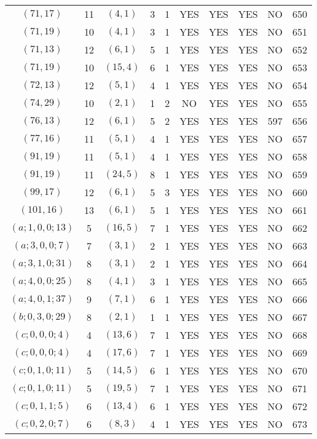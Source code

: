 \begin{longtable}{|c|c|c|c|c|c|c|c|c|c|}
$(71, 17)$ & 11 & $(4, 1)$ & 3 & 1 & YES & YES & YES & NO & 650\\
$(71, 19)$ & 10 & $(4, 1)$ & 3 & 1 & YES & YES & YES & NO & 651\\
$(71, 13)$ & 12 & $(6, 1)$ & 5 & 1 & YES & YES & YES & NO & 652\\
$(71, 19)$ & 10 & $(15, 4)$ & 6 & 1 & YES & YES & YES & NO & 653\\
$(72, 13)$ & 12 & $(5, 1)$ & 4 & 1 & YES & YES & YES & NO & 654\\
$(74, 29)$ & 10 & $(2, 1)$ & 1 & 2 & NO & YES & YES & NO & 655\\
$(76, 13)$ & 12 & $(6, 1)$ & 5 & 2 & YES & YES & YES & 597 & 656\\
$(77, 16)$ & 11 & $(5, 1)$ & 4 & 1 & YES & YES & YES & NO & 657\\
$(91, 19)$ & 11 & $(5, 1)$ & 4 & 1 & YES & YES & YES & NO & 658\\
$(91, 19)$ & 11 & $(24, 5)$ & 8 & 1 & YES & YES & YES & NO & 659\\
$(99, 17)$ & 12 & $(6, 1)$ & 5 & 3 & YES & YES & YES & NO & 660\\
$(101, 16)$ & 13 & $(6, 1)$ & 5 & 1 & YES & YES & YES & NO & 661\\
$(a; 1, 0, 0; 13)$ & 5 & $(16, 5)$ & 7 & 1 & YES & YES & YES & NO & 662\\
$(a; 3, 0, 0; 7)$ & 7 & $(3, 1)$ & 2 & 1 & YES & YES & YES & NO & 663\\
$(a; 3, 1, 0; 31)$ & 8 & $(3, 1)$ & 2 & 1 & YES & YES & YES & NO & 664\\
$(a; 4, 0, 0; 25)$ & 8 & $(4, 1)$ & 3 & 1 & YES & YES & YES & NO & 665\\
$(a; 4, 0, 1; 37)$ & 9 & $(7, 1)$ & 6 & 1 & YES & YES & YES & NO & 666\\
$(b; 0, 3, 0; 29)$ & 8 & $(2, 1)$ & 1 & 1 & YES & YES & YES & NO & 667\\
$(c; 0, 0, 0; 4)$ & 4 & $(13, 6)$ & 7 & 1 & YES & YES & YES & NO & 668\\
$(c; 0, 0, 0; 4)$ & 4 & $(17, 6)$ & 7 & 1 & YES & YES & YES & NO & 669\\
$(c; 0, 1, 0; 11)$ & 5 & $(14, 5)$ & 6 & 1 & YES & YES & YES & NO & 670\\
$(c; 0, 1, 0; 11)$ & 5 & $(19, 5)$ & 7 & 1 & YES & YES & YES & NO & 671\\
$(c; 0, 1, 1; 5)$ & 6 & $(13, 4)$ & 6 & 1 & YES & YES & YES & NO & 672\\
$(c; 0, 2, 0; 7)$ & 6 & $(8, 3)$ & 4 & 1 & YES & YES & YES & NO & 673\\

\end{longtable}

